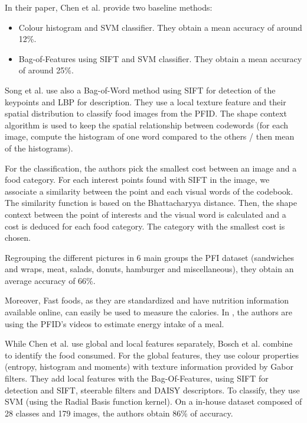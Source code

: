 In their paper, Chen et al. provide two baseline methods:
\begin{itemize}
    \item Colour histogram and SVM classifier. They obtain a mean accuracy of around 12\%.
    \item Bag-of-Features using SIFT and SVM classifier. They obtain a mean accuracy of around 25\%.
\end{itemize}

Song et al. \cite{Zong2010} use also a Bag-of-Word method using SIFT for detection of the keypoints and LBP for description. They use a local texture feature and their spatial distribution to classify food images from the PFID. The shape context algorithm is used to keep the spatial relationship between codewords (for each image, compute the histogram of one word compared to the others / then mean of the histograms).

For the classification, the authors pick the smallest cost between an image and a food category. For each interest points found with SIFT in the image, we associate a similarity between the point and each visual words of the codebook. The similarity function is based on the Bhattacharyya distance. Then, the shape context between the point of interests and the visual word is calculated and a cost is deduced for each food category. The category with the smallest cost is chosen.

Regrouping the different pictures in 6 main groups the PFI dataset (sandwiches and wraps, meat, salads, donuts, hamburger and miscellaneous), they obtain an average accuracy of 66\%.

Moreover, Fast foods, as they are standardized and have nutrition information available online, can easily be used to measure the calories. In \cite{Wen2009}, the authors are using the PFID's videos to estimate energy intake of a meal.

While Chen et al. use global and local features separately, Bosch et al. \cite{Bosch2011} combine to identify the food consumed. For the global features, they use colour properties (entropy, histogram and moments) with texture information provided by Gabor filters. They add local features with the Bag-Of-Features, using SIFT for detection and SIFT, steerable filters and DAISY descriptors. To classify, they use SVM (using the Radial Basis function kernel). On a in-house dataset composed of 28 classes and 179 images, the authors obtain 86\% of accuracy.


